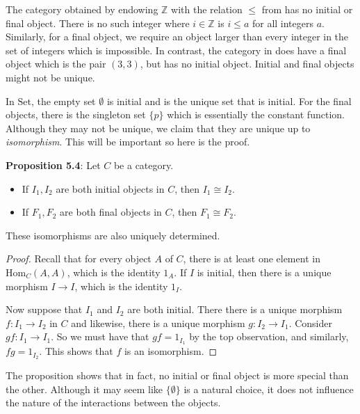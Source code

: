 \documentclass{report}
\begin{document}
\begin{examples}
    \begin{example}[\label{exm:1.5.2}]
        The category obtained by endowing $\mathbb{Z}$ with the relation $\leq $ from  has no initial or final object. There is no such integer where $i \in \mathbb{Z}$ is $i \leq a$ for all integers $a$. Similarly, for a final object, we require an object larger than every integer in the set of integers which is impossible. In contrast, the category in  does have a final object which is the pair $(3, 3)$, but has no initial object. Initial and final objects might not be unique.
    \end{example}

    \begin{example}[\label{exm:1.5.3}]
        In $\text{Set}$, the empty set $\emptyset$ is initial and is the unique set that is initial. For the final objects, there is the singleton set $\{p\}$ which is essentially the constant function. Although they may not be unique, we claim that they are unique up to \textit{isomorphism}. This will be important so here is the proof.

        \textbf{Proposition 5.4}: Let $C$ be a category.
            \begin{itemize}
                \item If $I_{1}, I_{2}$ are both initial objects in $C$, then $I_{1} \cong I_{2}$.

                \item If $F_{1}, F_{2}$ are both final objects in $C$, then $F_{1} \cong F_{2}$. 
            \end{itemize}
        These isomorphisms are also uniquely determined.
            \begin{proof}
                Recall that for every object $A$ of $C$, there is at least one element in $\text{Hom}_{C}(A, A)$, which is the identity $1_{A}$. If $I$ is initial, then there is a unique morphism $I \rightarrow I$, which is the identity $1_{I}$. 

                Now suppose that $I_{1}$ and $I_{2}$ are both initial. There there is a unique morphism $f : I_{1} \rightarrow I_{2}$ in $C$ and likewise, there is a unique morphism $g : I_{2} \rightarrow I_{1}$. Consider $gf : I_{1} \rightarrow I_{1}$. So we must have that $gf = 1_{I_{1}}$ by the top observation, and similarly, $fg = 1_{I_{2}}$. This shows that $f$ is an isomorphism.
            \end{proof}
        The proposition shows that in fact, no initial or final object is more special than the other. Although it may seem like $\{\emptyset\}$ is a natural choice, it does not influence the nature of the interactions between the objects.
    \end{example}
\end{examples}
\end{document}
